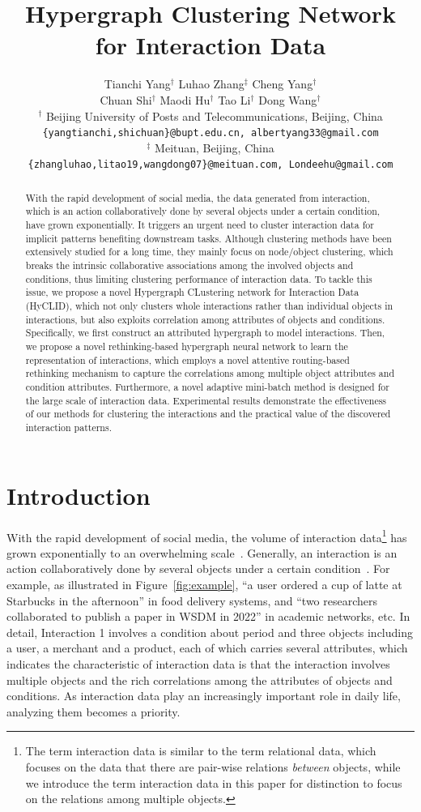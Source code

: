 \documentclass[11pt]{article}
\title{Hypergraph Clustering Network for Interaction Data}
\author{Tianchi Yang$^{\dagger}$
\hspace{2em} Luhao Zhang$^{\ddagger}$
\hspace{2em} Cheng Yang$^{\dagger}$ \\
Chuan Shi$^{\dagger}$
\hspace{2em} Maodi Hu$^{\dagger}$
\hspace{2em} Tao Li$^{\dagger}$
\hspace{2em} Dong Wang$^{\dagger}$ \\
$^{\dagger}$ Beijing University of Posts and Telecommunications, Beijing, China \\
\texttt{\small\{yangtianchi,shichuan\}@bupt.edu.cn, albertyang33@gmail.com}\\
$^{\ddagger}$ Meituan, Beijing, China \\
\texttt{\small\{zhangluhao,litao19,wangdong07\}@meituan.com, Londeehu@gmail.com}}
\def\modelname{HyCLID}
\begin{document}
\maketitle
\begin{abstract}
	With the rapid development of social media, the data generated from interaction, which is an action collaboratively done by several objects under a certain condition, have grown exponentially. It triggers an urgent need to cluster interaction data for implicit patterns benefiting downstream tasks. Although clustering methods have been extensively studied for a long time, they mainly focus on node/object clustering, which breaks the intrinsic collaborative associations among the involved objects and conditions, thus limiting clustering performance of interaction data. To tackle this issue, we propose a novel Hypergraph CLustering network for Interaction Data (\modelname), which not only clusters whole interactions rather than individual objects in interactions, but also exploits correlation among attributes of objects and conditions. Specifically, we first construct an attributed hypergraph to model interactions. Then, we propose a novel rethinking-based hypergraph neural network to learn the representation of interactions, which employs a novel attentive routing-based rethinking mechanism to capture the correlations among multiple object attributes and condition attributes. Furthermore, a novel adaptive mini-batch method is designed for the large scale of interaction data. Experimental results demonstrate the effectiveness of our methods for clustering the interactions and the practical value of the discovered interaction patterns.
\end{abstract}

\section{Introduction}  \label{sec:introduction}
With the rapid development of social media, the volume of interaction data\footnote{The term interaction data is similar to the term relational data, which focuses on the data that there are pair-wise relations \textit{between} objects, while we introduce the term interaction data in this paper for distinction to focus on the relations among multiple objects. } has grown exponentially to an overwhelming scale~\cite{kou_social_2016,yang_co-clustering_2022}.
Generally, an interaction is an action collaboratively done by several objects under a certain condition~\cite{yang_co-clustering_2022}. For example, as illustrated in Figure~\ref{fig:example}, ``a user ordered a cup of latte at Starbucks in the afternoon'' in food delivery systems, and ``two researchers collaborated to publish a paper in WSDM in 2022'' in academic networks, etc. In detail, Interaction 1 involves a condition about period and three objects including a user, a merchant and a product, each of which carries several attributes, which indicates the characteristic of interaction data is that the interaction involves multiple objects and the rich correlations among the attributes of objects and conditions.
As interaction data play an increasingly important role in daily life, analyzing them becomes a priority.
\end{document}
